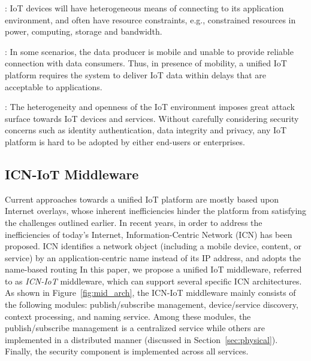 :
IoT devices will have heterogeneous means of connecting to its application environment, and often have resource constraints, e.g., constrained resources in power, computing, storage and bandwidth.

:
In some scenarios, the data producer is mobile and unable to provide reliable connection with data consumers. Thus, in presence of mobility, a unified IoT platform requires the system to deliver IoT data within delays that are acceptable to applications.

:
The heterogeneity and openness of the IoT environment imposes great attack surface towards IoT devices and services. Without carefully considering security concerns such as identity authentication, data integrity and privacy, any IoT platform is hard to be adopted by either end-users or enterprises.

\subsection{ICN-IoT Middleware}
Current approaches towards a unified IoT platform are mostly based upon Internet overlays, whose inherent inefficiencies hinder the platform from satisfying the challenges outlined earlier. In recent years, in order to address  the inefficiencies of today's Internet, Information-Centric Network (ICN) has been proposed. ICN identifies a network object (including a mobile device, content, or service) by an application-centric name instead of its IP address, and adopts the name-based routing
In this paper, we propose a unified IoT middleware, referred to as \emph{ICN-IoT} middleware, which can support several specific ICN architectures. As shown in Figure~\ref{fig:mid_arch}, the ICN-IoT middleware mainly consists of the following modules: publish/subscribe management, device/service discovery, context processing, and naming service. Among these modules, the publish/subscribe management is a centralized service while others are implemented in a distributed manner (discussed in Section~\ref{sec:physical}). Finally, the security component is implemented across all services.

